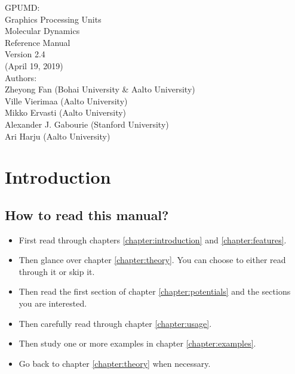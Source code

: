 \documentclass[12pt,a4paper]{report}
\begin{document}
\begin{center}
  \huge
  {
   \vspace*{1.0cm}
   GPUMD: \\
   Graphics Processing Units \\
   Molecular Dynamics\\
   \vspace*{1.0cm}
   Reference Manual\\
   \vspace*{1.0cm}
   Version 2.4\\
   \vspace*{1.0cm}
   (April 19, 2019)\\
  \vspace*{2.0cm}
  }
  \large
  {
  Authors: \\
  Zheyong Fan (Bohai University \& Aalto University)\\
  Ville Vierimaa (Aalto University)\\
  Mikko Ervasti (Aalto University)\\
  Alexander J. Gabourie (Stanford University)\\
  Ari Harju (Aalto University)\\
  }
  \vspace*{1.0cm}
\end{center}


\tableofcontents


\chapter{Introduction\label{chapter:introduction}}

\section{How to read this manual?}

\begin{itemize}
\item First read through chapters \ref{chapter:introduction} and \ref{chapter:features}.
\item Then glance over chapter \ref{chapter:theory}. You can choose to either read through it or skip it.
\item Then read the first section of chapter \ref{chapter:potentials} and the sections you are interested.
\item Then carefully read through chapter \ref{chapter:usage}.
\item Then study one or more examples in chapter \ref{chapter:examples}.
\item Go back to chapter \ref{chapter:theory} when necessary.
\end{itemize}
\end{document}
